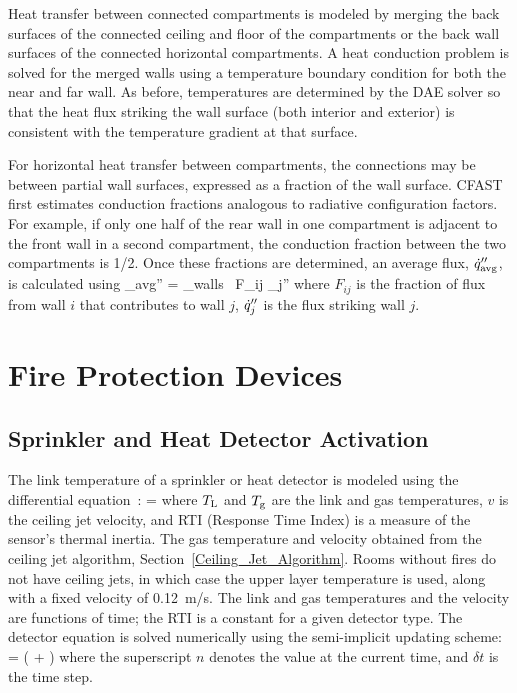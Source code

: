 Heat transfer between connected compartments is modeled by merging the back surfaces of the connected ceiling and floor of the compartments or the back wall surfaces of the connected horizontal compartments.  A heat conduction problem is solved for the merged walls using a temperature boundary condition for both the near and far wall.  As before, temperatures are determined by the DAE solver so that the heat flux striking the wall surface (both interior and exterior) is consistent with the temperature gradient at that surface.

For horizontal heat transfer between compartments, the connections may be between partial wall surfaces, expressed as a fraction of the wall surface. CFAST first estimates conduction fractions analogous to radiative configuration factors.    For example, if only one half of the rear wall in one compartment is adjacent to the front wall in a second compartment, the conduction fraction between the two compartments is 1/2.   Once these fractions are determined, an average flux, $\dot{q}_{\rm avg}''$, is calculated using
\be
   \dq_{\rm avg}'' = \sum_{\rm walls} \, F_{ij} \dq_j''
\ee
where $F_{ij}$ is the fraction of flux from wall $i$ that contributes to wall $j$, $\dot{q}_j''$ is the flux striking wall $j$.



\chapter{Fire Protection Devices}



\section{Sprinkler and Heat Detector Activation}

The link temperature of a sprinkler or heat detector is modeled using the differential equation~\cite{Heskestad:1976}:
\be
    =  \brackets{\Tg - \TL}  \label{eq:RTI}
\ee
where $T_{\rm L}$ and $T_{\rm g}$ are the link and gas temperatures, $v$ is the ceiling jet velocity, and RTI (Response Time Index) is a measure of the sensor's thermal inertia. The gas temperature and velocity obtained from the ceiling jet algorithm, Section~\ref{Ceiling_Jet_Algorithm}. Rooms without fires do not have ceiling jets, in which case the upper layer temperature is used, along with a fixed velocity of 0.12~m/s. The link and gas temperatures and the velocity are functions of time; the RTI is a constant for a given detector type. The detector equation is solved numerically using the semi-implicit updating scheme:
\be
    =  \left(    +    \right) \label{eq:RTI_rewritten}
\ee
where the superscript $n$ denotes the value at the current time, and $\delta t$ is the time step.


